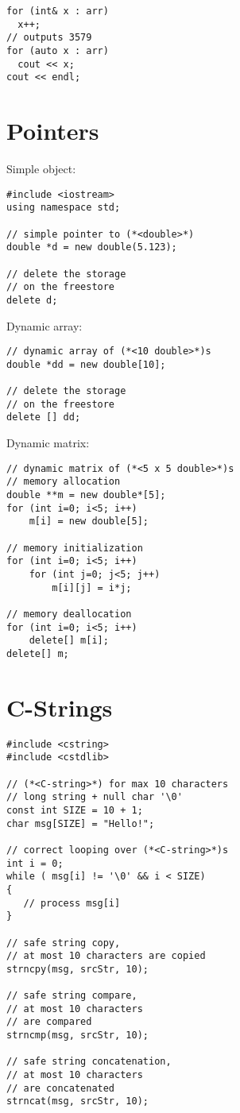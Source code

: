 \documentclass[10pt]{article}
\begin{document}
\begin{multicols*}{3}
\begin{lstlisting}
for (int& x : arr)
  x++;
// outputs 3579
for (auto x : arr)
  cout << x;
cout << endl;
\end{lstlisting}
%
%
\section*{Pointers}
\small
Simple object:
\lstset {language=C++}
\begin{lstlisting}
#include <iostream>
using namespace std;

// simple pointer to (*<double>*)
double *d = new double(5.123);

// delete the storage
// on the freestore
delete d;
\end{lstlisting}
Dynamic array:
\lstset {language=C++}
\begin{lstlisting}
// dynamic array of (*<10 double>*)s
double *dd = new double[10];

// delete the storage
// on the freestore
delete [] dd;
\end{lstlisting}
Dynamic matrix:
\lstset {language=C++}
\begin{lstlisting}
// dynamic matrix of (*<5 x 5 double>*)s
// memory allocation
double **m = new double*[5];
for (int i=0; i<5; i++)
    m[i] = new double[5];

// memory initialization    
for (int i=0; i<5; i++)
    for (int j=0; j<5; j++)
        m[i][j] = i*j;

// memory deallocation
for (int i=0; i<5; i++)
    delete[] m[i];
delete[] m;
\end{lstlisting}
%
%
\section*{C-Strings}
\small
\lstset {language=C++}
\begin{lstlisting}
#include <cstring>
#include <cstdlib>

// (*<C-string>*) for max 10 characters
// long string + null char '\0'
const int SIZE = 10 + 1;
char msg[SIZE] = "Hello!";

// correct looping over (*<C-string>*)s
int i = 0;
while ( msg[i] != '\0' && i < SIZE)
{
   // process msg[i]
}

// safe string copy,
// at most 10 characters are copied
strncpy(msg, srcStr, 10);

// safe string compare,
// at most 10 characters
// are compared
strncmp(msg, srcStr, 10);

// safe string concatenation,
// at most 10 characters 
// are concatenated
strncat(msg, srcStr, 10);


\end{lstlisting}
\end{multicols*}
\end{document}
